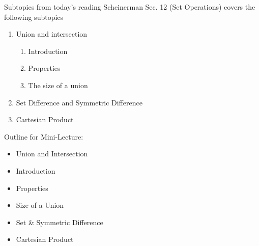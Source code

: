 \documentclass[10pt]{beamer}
\begin{document}
\begin{frame}{Subtopics from today's reading}
Scheinerman Sec. 12 (Set Operations) covers the following subtopics
\begin{enumerate}
	\item Union and intersection
	\begin{enumerate}
	\item[a.] Introduction
 	\item[b.] Properties
 	\item[c.] The size of a union
 	\end{enumerate}
	\item Set Difference and Symmetric Difference
	\item Cartesian Product 
\end{enumerate}

\end{frame}


\begin{frame}[standout]
Outline for Mini-Lecture:
\begin{itemize}
\item \alert{\textbullet \quad Union and Intersection}
\item \alert{\quad \textopenbullet \quad Introduction}
\item \quad \textopenbullet \quad Properties
\item \quad \textopenbullet \quad Size of a Union
\item \textbullet \quad Set \& Symmetric Difference 
\item \textbullet \quad Cartesian Product
\end{itemize}
\end{frame}
\end{document}
